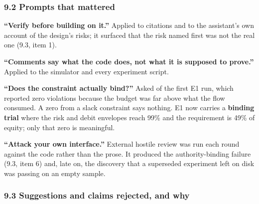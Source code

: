\documentclass[10pt,a4paper]{article}
\begin{document}
\subsubsection{9.2 Prompts that mattered}\label{prompts-that-mattered}

\textbf{``Verify before building on it.''} Applied to citations and to the assistant's
own account of the design's risks; it surfaced that the risk named first was not
the real one (9.3, item 1).

\textbf{``Comments say what the code does, not what it is supposed to prove.''} Applied
to the simulator and every experiment script.

\textbf{``Does the constraint actually bind?''} Asked of the first E1 run, which
reported zero violations because the budget was far above what the flow consumed.
A zero from a slack constraint says nothing. E1 now carries a \textbf{binding trial}
where the risk and debit envelopes reach 99\% and the requirement is 49\% of
equity; only that zero is meaningful.

\textbf{``Attack your own interface.''} External hostile review was run each round
against the code rather than the prose. It produced the authority-binding failure
(9.3, item 6) and, late on, the discovery that a superseded experiment left on
disk was passing on an empty sample.

\subsubsection{9.3 Suggestions and claims rejected, and why}\label{suggestions-and-claims-rejected-and-why}
\end{document}
